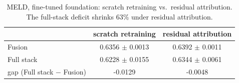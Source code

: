 \begin{table}[t]
\centering
\caption{MELD, fine-tuned foundation: scratch retraining vs.\ residual attribution. The full-stack deficit shrinks 63\% under residual attribution.}
\label{tab:scratch-vs-residual}
\begin{tabular}{lcc}
\toprule
 & scratch retraining & residual attribution \\
\midrule
Fusion & 0.6356 $\pm$ 0.0013 & 0.6392 $\pm$ 0.0011 \\
Full stack & 0.6228 $\pm$ 0.0155 & 0.6344 $\pm$ 0.0061 \\
gap (Full stack $-$ Fusion) & -0.0129 & -0.0048 \\
\bottomrule
\end{tabular}
\end{table}
